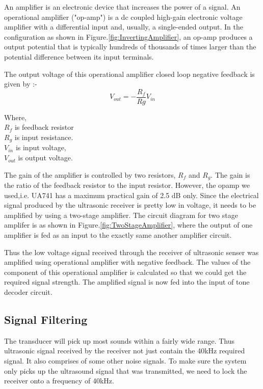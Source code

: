 An amplifier is an electronic device that increases the power of a signal. An operational amplifier ("op-amp") is a \gls{dc} coupled high-gain electronic voltage amplifier with a differential input and, usually, a single-ended output. In the configuration as shown in Figure.\ref{fig:InvertingAmplifier}, an op-amp produces a output potential that is typically hundreds of thousands of times larger than the potential difference between its input terminals. 



The output voltage of this operational amplifier closed loop negative feedback is given by :-
\begin{equation}
	V_{out} = -\frac{R_f}{Rg}V_{in}
\end{equation} 


Where,\\ $R_f$ is feedback resistor \\$R_g$ is input resistance. \\$V_{in}$ is input voltage, \\$V_{out}$ is output voltage. 

The gain of the amplifier is controlled by two resistors, $R_f$ and $R_g$. The gain is the ratio of the feedback resistor to the input resistor. However, the opamp we used,i.e. UA741 has a maximum practical gain of 2.5 dB only. Since the electrical signal produced by the ultrasonic receiver is pretty low in voltage, it needs to be amplified by using a two-stage amplifier. The circuit diagram for two stage amplifer is as shown in Figure.\ref{fig:TwoStageAmplifier}, where the output of one amplifier is fed as an input to the exactly same another amplifier circuit.


	
	
Thus the low voltage signal received through the receiver of ultrasonic senser was amplified using operational amplifier with negative feedback. The values of the component of this operational amplifier is calculated so that we could get the required signal strength. The amplified signal is now fed into the input of tone decoder circuit.

\subsection{Signal Filtering}

The transducer will pick up most sounds within a fairly wide range. Thus ultrasonic signal received by the receiver not just contain the 40kHz required signal. It also comprises of some other noise signals. To make sure the system only picks up the ultrasound signal that was transmitted, we need to lock the receiver onto a frequency of 40kHz. 


